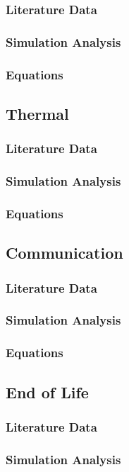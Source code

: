 \documentclass[3p]{elsarticle}
\begin{document}
\subsubsection{Literature Data}
\subsubsection{Simulation Analysis}
\subsubsection{Equations}

\subsection{Thermal}
\subsubsection{Literature Data}
\subsubsection{Simulation Analysis}
\subsubsection{Equations}

\subsection{Communication}
\subsubsection{Literature Data}
\subsubsection{Simulation Analysis}
\subsubsection{Equations}

\subsection{End of Life}
\subsubsection{Literature Data}
\subsubsection{Simulation Analysis}
\end{document}
